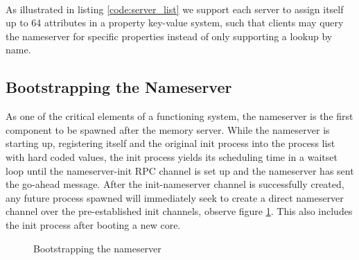 \paragraph{}
As illustrated in listing \ref{code:server_list} we support each server to assign itself up to 64 attributes in a property key-value system, such that clients may query the nameserver for specific properties instead of only supporting a lookup by name.


\subsection{Bootstrapping the Nameserver}

As one of the critical elements of a functioning system, the nameserver is the first component to be spawned after the memory server. While the nameserver is starting up, registering itself and the original init process into the process list with hard coded values, the init process yields its scheduling time in a waitset loop until the nameserver-init RPC channel is set up and the nameserver has sent the go-ahead message. After the init-nameserver channel is successfully created, any future process spawned will immediately seek to create a direct nameserver channel over the pre-established init channels, observe figure \ref{fig:ns_bootstrap}. This also includes the init process after booting a new core.

\begin{figure}[ht]
    \centering
        \scalebox{0.9}{
            
        }
    \caption{Bootstrapping the nameserver}
    \label{fig:ns_bootstrap}
    
\end{figure}








